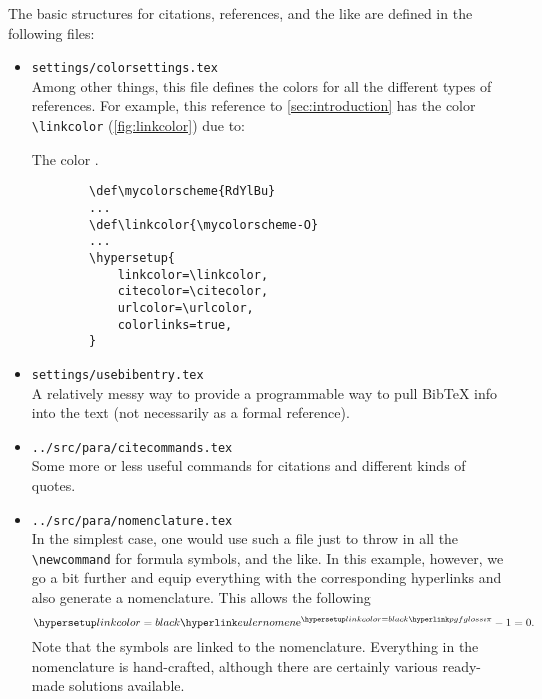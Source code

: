 The basic structures for citations, references, and the like are defined in the following files:
\begin{itemize}
	\item \texttt{settings/colorsettings.tex} \\ 
	Among other things, this file defines the colors for all the different types of references. For example, this reference to \cref{sec:introduction} has the color \linebreak \verb|\linkcolor| (\cf \cref{fig:linkcolor}) due to:
	\begin{marginfigure}[0cm]
		\centering
		\caption{The color \texttt{\linkcolor}.}\label{fig:linkcolor}
	\end{marginfigure}
	\begin{verbatim}
		\def\mycolorscheme{RdYlBu}
		...
		\def\linkcolor{\mycolorscheme-O}
		...
		\hypersetup{
			linkcolor=\linkcolor,
			citecolor=\citecolor,
			urlcolor=\urlcolor,
			colorlinks=true,
		}
	\end{verbatim}
	\item \texttt{settings/usebibentry.tex} \\ 
	A relatively messy way to provide a programmable way to pull BibTeX info into the text (not necessarily as a formal reference).
	
	\item \texttt{../src/para/citecommands.tex} \\ 
	Some more or less useful commands for citations and different kinds of quotes.
	
	\item \texttt{../src/para/nomenclature.tex} \\ 
	In the simplest case, one would use such a file just to throw in all the \verb|\newcommand| for formula symbols, and the like. In this example, however, we go a bit further and equip everything with the corresponding hyperlinks and also generate a nomenclature. This allows the following
	\begin{equation}\label{eq:mostbeautifulequation}
		\euler^{\complexunit\pi} - 1 = 0.
	\end{equation}
	Note that the symbols are linked to the nomenclature. Everything in the nomenclature is hand-crafted, although there are certainly various ready-made solutions available.
	

\end{itemize}
